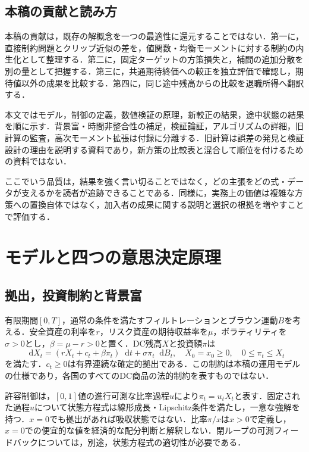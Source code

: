 \documentclass[11pt,a4paper]{article}
\numberwithin{equation}{section}
\numberwithin{table}{section}
\numberwithin{figure}{section}
\theoremstyle{plain}
\theoremstyle{definition}
\newcommand{\dd}{\mathop{}\!\mathrm{d}}
\begin{document}
\subsection{本稿の貢献と読み方}
本稿の貢献は，既存の解概念を一つの最適性に還元することではない．第一に，直接制約問題とクリップ近似の差を，値関数・均衡モーメントに対する制約の内生化として整理する．第二に，固定ターゲットの方策損失と，補間の追加分散を別の量として把握する．第三に，共通期待終価への較正を独立評価で確認し，期待値以外の成果を比較する．第四に，同じ途中残高からの比較を退職所得へ翻訳する．

本文ではモデル，制御の定義，数値検証の原理，新較正の結果，途中状態の結果を順に示す．背景富・時間非整合性の補足，検証論証，アルゴリズムの詳細，旧計算の監査，高次モーメント拡張は付録に分離する．旧計算は誤差の発見と検証設計の理由を説明する資料であり，新方策の比較表と混合して順位を付けるための資料ではない．

ここでいう品質は，結果を強く言い切ることではなく，どの主張をどの式・データが支えるかを読者が追跡できることである．同様に，実務上の価値は複雑な方策への置換自体ではなく，加入者の成果に関する説明と選択の根拠を増やすことで評価する．
\FloatBarrier
\section{モデルと四つの意思決定原理}
\label{sec:model}
\subsection{拠出，投資制約と背景富}
有限期間$[0,T]$，通常の条件を満たすフィルトレーションとブラウン運動$B$を考える．安全資産の利率を$r$，リスク資産の期待収益率を$\mu$，ボラティリティを$\sigma>0$とし，$\beta=\mu-r>0$と置く．DC残高$X$と投資額$\pi$は
\begin{equation}
\dd X_t=(rX_t+c_t+\beta\pi_t)\dd t+\sigma\pi_t\dd B_t,
\quad X_0=x_0\geq0,\quad 0\leq\pi_t\leq X_t
\label{eq:state}
\end{equation}
を満たす．$c_t\geq0$は有界連続な確定的拠出である．この制約は本稿の運用モデルの仕様であり，各国のすべてのDC商品の法的制約を表すものではない．

許容制御は，$[0,1]$値の進行可測な比率過程$u$により$\pi_t=u_tX_t$と表す．固定された過程$u$について状態方程式は線形成長・Lipschitz条件を満たし，一意な強解を持つ．$x=0$でも拠出があれば吸収状態ではない．比率$\pi/x$は$x>0$で定義し，$x=0$での便宜的な値を経済的な配分判断と解釈しない．閉ループの可測フィードバックについては，別途，状態方程式の適切性が必要である．
\end{document}
